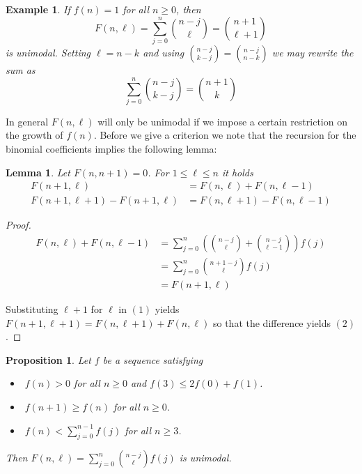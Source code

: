 \documentclass[12pt]{amsart}
\newtheorem{lem}[thm]{Lemma}
\newtheorem{prop}[thm]{Proposition}
\newtheorem{example}[thm]{Example}
\theoremstyle{definition}
\theoremstyle{remark}
\begin{document}
\begin{example}
If $f(n)=1$ for all $n\ge 0$, then 
\begin{equation*}
F(n,\ell)=\sum_{j=0}^n \binom{n-j}{\ell}=\binom{n+1}{\ell+1}
\end{equation*}
is unimodal. Setting $\ell=n-k$ and using $\binom{n-j}{k-j}=
\binom{n-j}{n-k}$ we may rewrite the sum as
\begin{equation*}
\sum_{j=0}^n \binom{n-j}{k-j}=\binom{n+1}{k}
\end{equation*} 
\end{example}

In general $F(n,\ell)$ will only be unimodal if we impose
a certain restriction on the growth of $f(n)$.
Before we give a criterion we note that
the recursion for the binomial coefficients implies the
following lemma:

\begin{lem}
Let $F(n,n+1)=0$. For $1\le \ell\le n$ it holds
\begin{align}\label{rec}
F(n+1,\ell) & = F(n,\ell)+F(n,\ell-1)\\
F(n+1,\ell+1)-F(n+1,\ell) & = F(n,\ell+1)-F(n,\ell-1)
\end{align}
\end{lem}

\begin{proof}

\begin{align*}
F(n,\ell)+F(n,\ell-1)
 & = \sum_{j=0}^{n}\left(\binom{n-j}{\ell}+\binom{n-j}{\ell-1}\right)f(j)\\
 & = \sum_{j=0}^{n}\binom{n+1-j}{\ell}f(j)\\
 & = F(n+1,\ell)
\end{align*}

Substituting $\ell+1$ for $\ell$ in $(1)$ yields $F(n+1,\ell+1)=F(n,\ell+1)+F(n,\ell)$ so that
the difference yields $(2)$.
\end{proof}  

\begin{prop}
Let $f$ be a sequence satisfying

\begin{itemize}
\item[(a)] $\; f(n)>0$ for all $n\ge 0$ and $f(3)\le 2f(0)+f(1)$.
\item[(b)] $\; f(n+1) \ge f(n)$ for all $n\ge 0$.
\item[(c)] $\; f(n) < \sum_{j=0}^{n-1}f(j)$ for all $n\ge 3$.
\end{itemize}        

Then $F(n,\ell)=\sum_{j=0}^n \binom{n-j}{\ell}f(j)$ is unimodal.
\end{prop}
\end{document}
